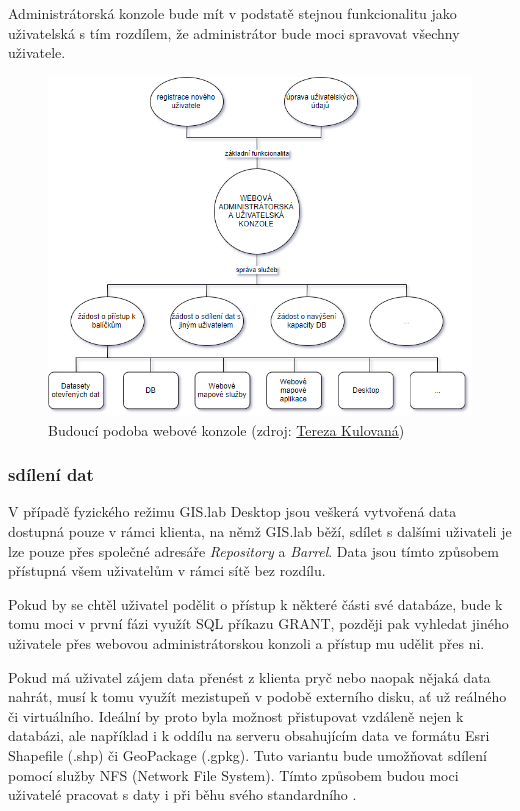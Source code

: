 Administrátorská konzole bude mít v podstatě stejnou funkcionalitu
jako uživatelská s tím rozdílem, že administrátor bude moci spravovat
všechny uživatele.

\begin{figure}[H] \centering
    \includegraphics[width=400pt]{./pictures/console_services_02.png}
    \caption[Budoucí podoba webové konzole]{Budoucí podoba webové konzole (zdroj:
	\href{}{Tereza Kulovaná})}
    \label{fig:konzole-sluzby}
\end{figure}

\subsubsection{sdílení dat}
V případě fyzického režimu GIS.lab Desktop jsou veškerá vytvořená data
dostupná pouze v rámci klienta, na němž GIS.lab běží, sdílet s dalšími
uživateli je lze pouze přes společné adresáře \textit{Repository} a
\textit{Barrel}. Data jsou tímto způsobem přístupná všem uživatelům v
rámci sítě bez rozdílu.

Pokud by se chtěl uživatel podělit o přístup k některé části své
databáze, bude k tomu moci v první fázi využít SQL příkazu GRANT,
později pak vyhledat jiného uživatele přes webovou administrátorskou
konzoli a přístup mu udělit přes ni.

Pokud má uživatel zájem data přenést z klienta pryč nebo naopak nějaká
data nahrát, musí k tomu využít mezistupeň v podobě externího disku,
ať už reálného či virtuálního. Ideální by proto byla možnost
přistupovat vzdáleně nejen k databázi, ale například i k oddílu na
serveru obsahujícím data ve formátu Esri Shapefile (.shp) či
GeoPackage (.gpkg). Tuto variantu bude umožňovat sdílení pomocí služby
NFS (Network File System). Tímto způsobem budou moci uživatelé
pracovat s daty i při běhu svého standardního .

